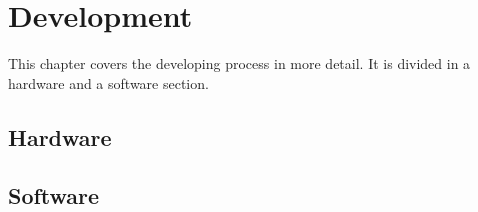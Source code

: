 \chapter{Development}
This chapter covers the developing process in more detail.
It is divided in a hardware and a software section.

\section{Hardware}


\clearpage
\section{Software}


